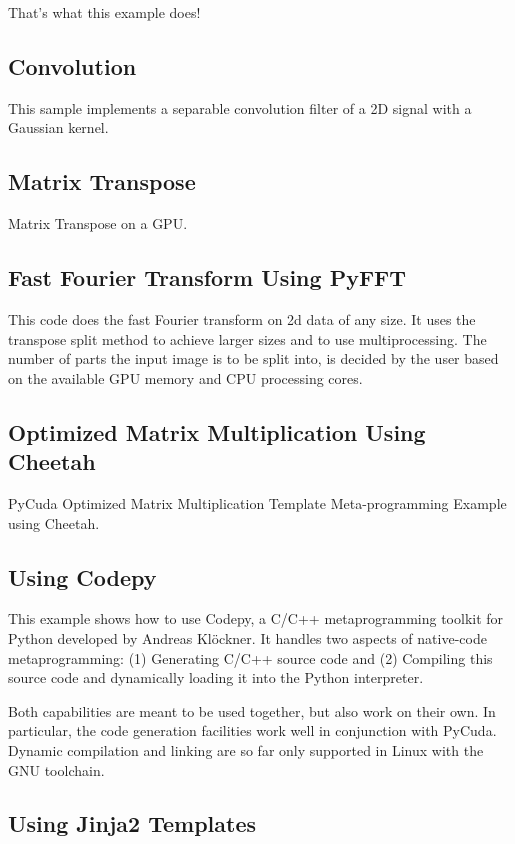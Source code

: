 \documentclass[article,A4,12pt]{llncs}
\begin{document}
That's what this example does!

\subsection{Convolution}

This sample implements a separable convolution filter of a 2D signal with a Gaussian kernel.

\subsection{Matrix Transpose}

Matrix Transpose on a GPU.

\subsection{Fast Fourier Transform Using PyFFT }

This code does the fast Fourier transform on 2d data of any size. 
 It uses the transpose split method to achieve larger sizes and to
 use multiprocessing. The number of parts the input image is to be 
 split into, is decided by the user based on the available GPU memory 
 and CPU processing cores. 

\subsection{Optimized Matrix Multiplication Using Cheetah}

PyCuda Optimized Matrix Multiplication 
Template Meta-programming Example using Cheetah.

\subsection{Using Codepy}

This example shows how to use Codepy, a C/C++ metaprogramming toolkit for 
Python developed by Andreas Kl\"ockner. It handles two aspects of native-code 
metaprogramming: (1) Generating C/C++ source code and (2)
Compiling this source code and dynamically loading it into the Python interpreter.

Both capabilities are meant to be used together, but also work on their own. In particular, the code generation facilities work well in conjunction with PyCuda. Dynamic compilation and linking are so far only supported in Linux with the GNU toolchain.

\subsection{Using Jinja2 Templates}
\end{document}
